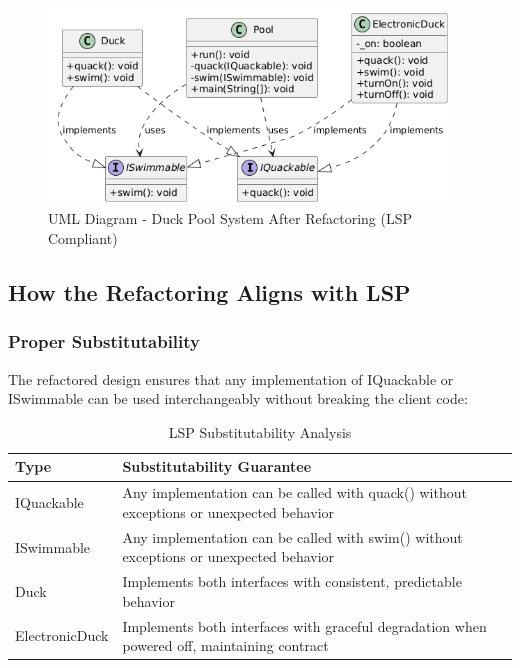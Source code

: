 \begin{figure}[H]
    \centering
    \includegraphics[width=0.95\textwidth]{LSP/plantUML/after.png}
    \caption{UML Diagram - Duck Pool System After Refactoring (LSP Compliant)}
    \label{fig:lsp_after}
\end{figure}

\subsection{How the Refactoring Aligns with LSP}

\subsubsection{Proper Substitutability}

The refactored design ensures that any implementation of IQuackable or ISwimmable can be used interchangeably without breaking the client code:

\begin{table}[H]
\centering
\begin{tabular}{|l|p{8cm}|}
\hline
\textbf{Type} & \textbf{Substitutability Guarantee} \\
\hline
IQuackable & Any implementation can be called with quack() without exceptions or unexpected behavior \\
\hline
ISwimmable & Any implementation can be called with swim() without exceptions or unexpected behavior \\
\hline
Duck & Implements both interfaces with consistent, predictable behavior \\
\hline
ElectronicDuck & Implements both interfaces with graceful degradation when powered off, maintaining contract \\
\hline
\end{tabular}
\caption{LSP Substitutability Analysis}
\label{tab:lsp_substitutability}
\end{table}


